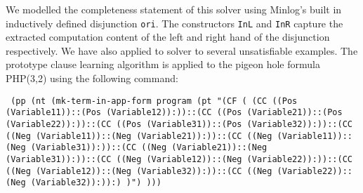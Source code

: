 We modelled the completeness statement of this solver using Minlog's built in inductively defined disjunction \texttt{ori}. The constructors \texttt{InL} and \texttt{InR} capture the extracted computation content of the left and right hand of the disjunction respectively. We have also applied to solver to several unsatisfiable examples. The prototype clause learning algorithm is applied to the pigeon hole formula PHP(3,2) using the following command:

\begin{center}
\texttt{
(pp (nt (mk-term-in-app-form program (pt "(CF (                                                                
(CC ((Pos (Variable11))::(Pos (Variable12)):))::(CC ((Pos (Variable21))::(Pos (Variable22)):))::(CC ((Pos (Variable31))::(Pos (Variable32)):))::(CC ((Neg (Variable11))::(Neg (Variable21)):))::(CC ((Neg (Variable11))::(Neg (Variable31)):))::(CC ((Neg (Variable21))::(Neg (Variable31)):))::(CC ((Neg (Variable12))::(Neg (Variable22)):))::(CC ((Neg (Variable12))::(Neg (Variable32)):))::(CC ((Neg (Variable22))::(Neg (Variable32)):)):) )") )))}
\end{center}

